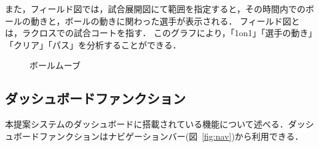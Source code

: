 \documentclass[sotsuron]{kuee}
\begin{document}
				また，フィールド図では，試合展開図にて範囲を指定すると，その時間内でのボールの動きと，ボールの動きに関わった選手が表示される．
				フィールド図とは，ラクロスでの試合コートを指す．
				このグラフにより，「1on1」「選手の動き」「クリア」「パス」を分析することができる．
					\begin{figure}
						\begin{center}
						\end{center}
						\caption{ボールムーブ}
				  		\label{fig:ballmove}
					\end{figure}
		
		\subsection{ダッシュボードファンクション}
			本提案システムのダッシュボードに搭載されている機能について述べる．ダッシュボードファンクションはナビゲーションバー(図~\ref{fig:nav})から利用できる．
\end{document}

